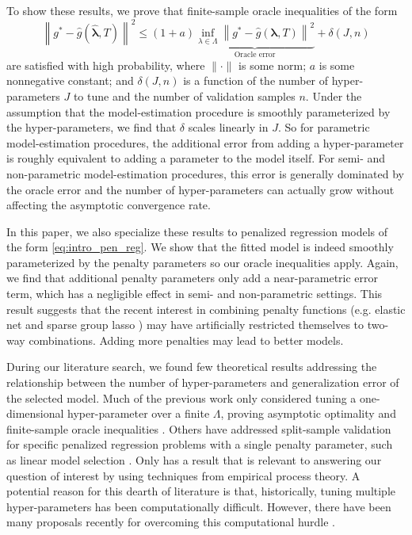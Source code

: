 \documentclass[12pt]{article} %
\theoremstyle{definition}
\begin{document}
To show these results, we prove that finite-sample oracle inequalities of the form
\begin{equation}
\label{thrm:intro_oracle_ineq}
\left \| g^* - \hat{g}\left (\hat{\boldsymbol{\lambda}}, T \right ) \right \|^2
\le
(1+a)
\underbrace{\inf_{\lambda \in \Lambda} \left \| g^* - \hat{g}\left (\boldsymbol{\lambda} , T \right ) \right \|^2}_{\text{Oracle error}}
+ \delta\left(J,n\right)
\end{equation}
are satisfied with high probability, where $\| \cdot \|$ is some norm; $a$ is some nonnegative constant; and $\delta(J,n)$ is a function of the number of hyper-parameters $J$ to tune and the number of validation samples $n$. Under the assumption that the model-estimation procedure is smoothly parameterized by the hyper-parameters, we find that $\delta$ scales linearly in $J$. So for parametric model-estimation procedures, the additional error from adding a hyper-parameter is roughly equivalent to adding a parameter to the model itself. For semi- and non-parametric model-estimation procedures, this error is generally dominated by the oracle error and the number of hyper-parameters can actually grow without affecting the asymptotic convergence rate.

In this paper, we also specialize these results to penalized regression models of the form \eqref{eq:intro_pen_reg}. We show that the fitted model is indeed smoothly parameterized by the penalty parameters so our oracle inequalities apply. Again, we find that additional penalty parameters only add a near-parametric error term, which has a negligible effect in semi- and non-parametric settings. This result suggests that the recent interest in combining penalty functions (e.g. elastic net and sparse group lasso \citep{zou2003regression, simon2013sparse}) may have artificially restricted themselves to two-way combinations. Adding more penalties may lead to better models.

During our literature search, we found few theoretical results addressing the relationship between the number of hyper-parameters and generalization error of the selected model. 
Much of the previous work only considered tuning a one-dimensional hyper-parameter over a finite $\Lambda$, proving asymptotic optimality \citep{van2004asymptotic} and finite-sample oracle inequalities \citep{van2003unified, gyorfi2006distribution}. Others have addressed split-sample validation for specific penalized regression problems with a single penalty parameter, such as linear model selection \citep{li1987asymptotic, shao1997asymptotic, golub1979generalized, chetverikov2016cross, chatterjee2015prediction}. Only \citet{lecue2012oracle} has a result that is relevant to answering our question of interest by using techniques from empirical process theory. A potential reason for this dearth of literature is that, historically, tuning multiple hyper-parameters has been computationally difficult. However, there have been many proposals recently for overcoming this computational hurdle \citep{bengio2000gradient, foo2008efficient, snoek2012practical}.
\end{document}
